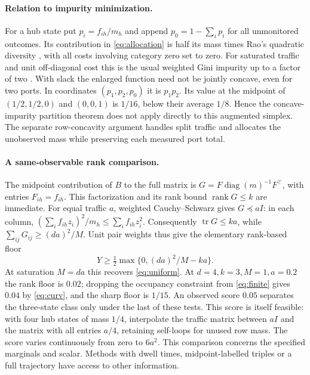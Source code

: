 \paragraph{Relation to impurity minimization.}
For a hub state put \(p_i=f_{ih}/m_h\) and append \(p_0=1-\sum_i p_i\) for all unmonitored outcomes. Its contribution in \eqref{eq:allocation} is half its mass times Rao's quadratic diversity \cite{rao}, with all costs involving category zero set to zero. For saturated traffic and unit off-diagonal cost this is the usual weighted Gini impurity up to a factor of two \cite{cicalese}. With slack the enlarged function need not be jointly concave, even for two ports. In coordinates \((p_1,p_2,p_0)\) it is \(p_1p_2\). Its value at the midpoint of \((1/2,1/2,0)\) and \((0,0,1)\) is \(1/16\), below their average \(1/8\). Hence the concave-impurity partition theorem \cite{burshtein} does not apply directly to this augmented simplex. The separate row-concavity argument handles split traffic and allocates the unobserved mass while preserving each measured port total.

\paragraph{A same-observable rank comparison.}
The midpoint contribution of \(B\) to the full matrix is \(G=F\operatorname{diag}(m)^{-1}F^\top\), with entries \(F_{ih}=f_{ih}\). This factorization and its rank bound \(\operatorname{rank}G\le k\) are immediate. For equal traffic \(a\), weighted Cauchy--Schwarz gives \(G\preceq aI\): in each column, \((\sum_i f_{ih}z_i)^2/m_h\le\sum_i f_{ih}z_i^2\). Consequently \(\operatorname{tr}G\le ka\), while \(\sum_{ij}G_{ij}\ge(da)^2/M\). Unit pair weights thus give the elementary rank-based floor
\[
 Y\ge \tfrac12\max\{0,(da)^2/M-ka\}.
\]
At saturation \(M=da\) this recovers \eqref{eq:uniform}. At \(d=4,k=3,M=1,a=0.2\) the rank floor is \(0.02\); dropping the occupancy constraint from \eqref{eq:finite} gives \(0.04\) by \eqref{eq:curv}, and the sharp floor is \(1/15\). An observed score \(0.05\) separates the three-state class only under the last of these tests. This score is itself feasible: with four hub states of mass \(1/4\), interpolate the traffic matrix between \(a I\) and the matrix with all entries \(a/4\), retaining self-loops for unused row mass. The score varies continuously from zero to \(6a^2\). This comparison concerns the specified marginals and scalar. Methods with dwell times, midpoint-labelled triples or a full trajectory have access to other information.

